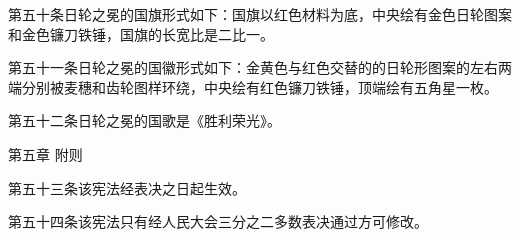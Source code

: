 {\noindent 第五十条\quad 日轮之冕的国旗形式如下：国旗以红色材料为底，中央绘有金色日轮图案和金色镰刀铁锤，国旗的长宽比是二比一。

\noindent 第五十一条\quad 日轮之冕的国徽形式如下：金黄色与红色交替的的日轮形图案的左右两端分别被麦穗和齿轮图样环绕，中央绘有红色镰刀铁锤，顶端绘有五角星一枚。

\noindent 第五十二条\quad 日轮之冕的国歌是《胜利荣光》。

\vspace{0.8\baselineskip}
\begin{center}
{\large 第五章\,\,附则}
\end{center}
\vspace{0.6\baselineskip}

\noindent 第五十三条\quad 该宪法经表决之日起生效。

\noindent 第五十四条\quad 该宪法只有经人民大会三分之二多数表决通过方可修改。

}


